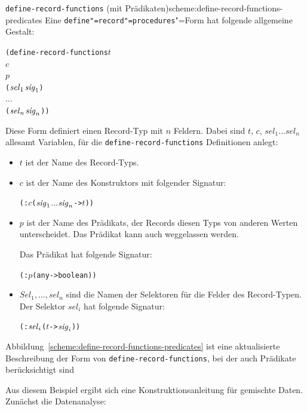 \begin{feature}{\texttt{define-record-functions} (mit Prädikaten)}{scheme:define-record-functions-predicates}
Eine \texttt{define"=record"=procedures}"=Form
hat folgende allgemeine Gestalt:\label{def:define-record-functions}
%
\begin{alltt}
(define-record-functions \(t\)
  \(c\)
  \(p\)
  (\(\mathit{sel}\sb{1}\) \(\mathit{sig}\sb{1}\))
  \(\ldots\)
  (\(\mathit{sel}\sb{n}\) \(\mathit{sig}\sb{n}\)))
\end{alltt}
%
Diese Form definiert einen Record-Typ mit $n$ Feldern.
Dabei sind $t$, $c$, $\mathit{sel}_1 \ldots \mathit{sel}_n$ allesamt Variablen, für die
\texttt{define-record-functions} Definitionen anlegt:
%
\begin{itemize}
\item $t$ ist der Name des Record-Typs.
\item $c$ ist der Name des Konstruktors mit 
  folgender Signatur:
%  
\begin{alltt}
(: \(c\) (\(\mathit{sig}\sb{1}\) \(\ldots\) \(\mathit{sig}\sb{n}\) -> \(t\)))
\end{alltt}
\item $p$ ist der Name des Prädikats, der Records diesen Typs von
  anderen Werten unterscheidet.  Das Prädikat kann auch weggelassen
  werden.

    Das Prädikat hat folgende Signatur:
\begin{alltt}
(: \(p\) (any -> boolean))
\end{alltt}
\item $\mathit{Sel}_1, \ldots, \mathit{sel}_n$ sind die Namen der Selektoren für die Felder
  des Record-Typen.  Der Selektor $\mathit{sel}_i$ hat folgende Signatur:
% 
\begin{alltt}
(: \(\mathit{sel}\sb{i}\) (\(t\) -> \(\mathit{sig}\sb{i}\)))
\end{alltt}
\end{itemize}
%
\end{feature}
%
Abbildung~\ref{scheme:define-record-functions-predicates} ist eine
aktualisierte Beschreibung der Form von
\texttt{define-record-functions}, bei der auch Prädikate
berücksichtigt sind

Aus diesem Beispiel ergibt sich eine Konstruktionsanleitung für
gemischte Daten.  Zunächst die Datenanalyse:

